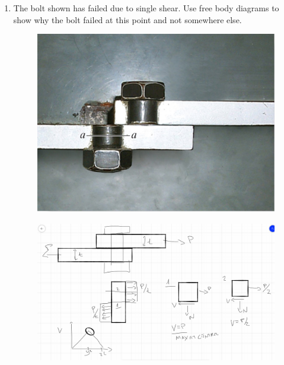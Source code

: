 \documentclass[12pt, oneside]{article}
\begin{document}
\begin{enumerate}
	\item %
		The bolt shown has failed due to single shear.
		Use free body diagrams to show why the bolt failed at this point and not somewhere else.
		\begin{figure}[H]
			\centering
			\includegraphics[width=0.6\linewidth]{bolt}
			\label{fig:bolt}
		\end{figure}

		\begin{figure}[H]
			\centering
			\includegraphics[width=0.8\linewidth]{hw1-9}
		\end{figure}

\end{enumerate}
\end{document}
